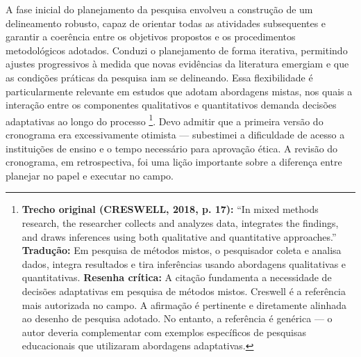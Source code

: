 A fase inicial do planejamento da pesquisa envolveu a construção de um delineamento robusto, capaz de orientar todas as atividades subsequentes e garantir a coerência entre os objetivos propostos e os procedimentos metodológicos adotados. Conduzi o planejamento de forma iterativa, permitindo ajustes progressivos à medida que novas evidências da literatura emergiam e que as condições práticas da pesquisa iam se delineando. Essa flexibilidade é particularmente relevante em estudos que adotam abordagens mistas, nos quais a interação entre os componentes qualitativos e quantitativos demanda decisões adaptativas ao longo do processo \cite{CRESWELL2018}\footnote{\textbf{Trecho original (CRESWELL, 2018, p. 17):} ``In mixed methods research, the researcher collects and analyzes data, integrates the findings, and draws inferences using both qualitative and quantitative approaches.'' \textbf{Tradução:} Em pesquisa de métodos mistos, o pesquisador coleta e analisa dados, integra resultados e tira inferências usando abordagens qualitativas e quantitativas. \textbf{Resenha crítica:} A citação fundamenta a necessidade de decisões adaptativas em pesquisa de métodos mistos. Creswell é a referência mais autorizada no campo. A afirmação é pertinente e diretamente alinhada ao desenho de pesquisa adotado. No entanto, a referência é genérica — o autor deveria complementar com exemplos específicos de pesquisas educacionais que utilizaram abordagens adaptativas.}. Devo admitir que a primeira versão do cronograma era excessivamente otimista — subestimei a dificuldade de acesso a instituições de ensino e o tempo necessário para aprovação ética. A revisão do cronograma, em retrospectiva, foi uma lição importante sobre a diferença entre planejar no papel e executar no campo.

